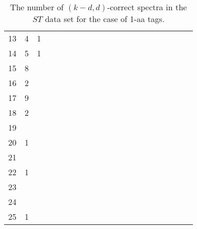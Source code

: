 \documentclass{article}[12pt]
\begin{document}
\begin{landscape}
\begin{table}[h]
{\begin{tabular}{|c|c|
c|c|c|c|c|c|c|c|c|c|c|c|c|c|c|c|c|c|c|}
13  & 4 & 1 &  &  &  &  &  &  &  &  &  &  &  &  &  &  &  &  &  & \\

14  & 5 & 1 &  &  &  &  &  &  &  &  &  &  &  &  &  &  &  &  &  & \\

15  & 8 &  &  &  &  &  &  &  &  &  &  &  &  &  &  &  &  &  &  & \\

16  & 2 &  &  &  &  &  &  &  &  &  &  &  &  &  &  &  &  &  &  & \\

17  & 9 &  &  &  &  &  &  &  &  &  &  &  &  &  &  &  &  &  &  & \\

18  & 2 &  &  &  &  &  &  &  &  &  &  &  &  &  &  &  &  &  &  & \\

19  &  &  &  &  &  &  &  &  &  &  &  &  &  &  &  &  &  &  &  & \\

20  & 1 &  &  &  &  &  &  &  &  &  &  &  &  &  &  &  &  &  &  & \\

21  &  &  &  &  &  &  &  &  &  &  &  &  &  &  &  &  &  &  &  & \\

22  & 1 &  &  &  &  &  &  &  &  &  &  &  &  &  &  &  &  &  &  & \\

23  &  &  &  &  &  &  &  &  &  &  &  &  &  &  &  &  &  &  &  & \\

24  &  &  &  &  &  &  &  &  &  &  &  &  &  &  &  &  &  &  &  & \\

25  & 1 &  &  &  &  &  &  &  &  &  &  &  &  &  &  &  &  &  &  & \\

  \hline
\end{tabular}
\par}
\centering
\caption{The number of $(k-d,d)$-correct spectra in the $ST$ data set for the case of 1-aa tags.}
\vspace{3mm}
\label{table:kd-1-correct-ST}
\end{table}
\end{landscape}
\end{document}
